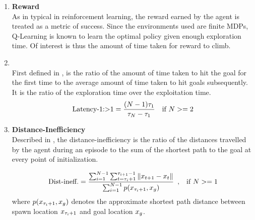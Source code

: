 \begin{enumerate}
    \item \textbf{Reward}\\\noindent
        As in typical in reinforcement learning, the reward earned by
        the agent is treated as a metric of success. Since the
        environments used are finite MDPs, Q-Learning is known to learn
        the optimal policy given enough exploration time. Of interest is
        thus the amount of time taken for reward to climb.

    \item \textbf{\Loo}\\
        First defined in \cite{MiPaViICLR2017}, \Loo is the ratio of the
        amount of time taken to hit the goal for the first time to the
        average amount of time taken to hit goals subsequently. It is
        the ratio of the exploration time over the exploitation time.
		\begin{align*}
			\text{Latency-1:\textgreater1} &= 
			\frac{(N-1) \tau_1}{\tau_{N} - \tau_1} & \text{if }  N >= 2
		\end{align*}%


    \item \textbf{Distance-Inefficiency}\\
        Described in \cite{dhiman2018critical}, the
        distance-inefficiency is the ratio of the distances travelled by
        the agent during an episode to the sum of the shortest path to
        the goal at every point of initialization.

		\begin{align*}
			\text{Dist-ineff.} &=
			\frac{ \sum_{i=1}^{N-1} \sum_{t=\tau_i + 1}^{\tau_{i+1} - 1} \|x_{t+1} - x_{t}\| }
			{ \sum_{i=1}^{N-1} p(x_{\tau_i + 1}, x_g) } \enspace, & \text{if } N >= 1
		\end{align*}%
		where $p(x_{\tau_i +1}, x_g)$ denotes the approximate shortest path
		distance between spawn location $x_{\tau_i+1}$ and goal location $x_g$.

\end{enumerate}


